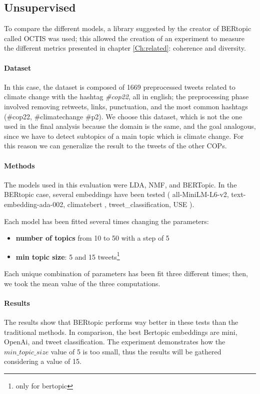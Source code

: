 \subsection{Unsupervised}
\label{sec:unsupervised}
To compare the different models, a library suggested by the creator of BERtopic called OCTIS \cite{DBLP:conf/clic-it/TerragniF21} \cite{terragni2020octis} was used; this allowed the creation of an experiment to measure the different metrics presented in chapter \ref{Ch:related}: coherence and diversity.




\paragraph{Dataset}
In this case, the dataset is composed of 1669 preprocessed tweets related to climate change with the hashtag \textit{\#cop22}, all in english; the preprocessing phase involved removing retweets, links, punctuation, and the most common hashtags (\#cop22, \#climatechange \#p2).  We choose this dataset, which is not the one used in the final analysis because the domain is the same, and the goal analogous, since we have to detect subtopics of a main topic which is climate change. For this reason we can generalize the result to the tweets of the other COPs.

\paragraph{Methods}

The models used in this evaluation were LDA, NMF, and BERTopic. In the BERtopic case, several embeddings have been tested (  all-MiniLM-L6-v2, text-embedding-ada-002, climatebert \cite{webersinke_climatebert_2022}, tweet\_classification, USE \cite{cer_use_2018}).

Each model has been fitted several times changing the parameters:
\begin{itemize}
    \item  \textbf{number of topics} from 10 to 50 with a step of 5 
    \item \textbf{min topic size}: 5 and 15  tweets\footnote{only for bertopic}
\end{itemize}


Each unique combination of parameters has been fit three different times; then, we took the mean value of the three computations.

\paragraph{Results}
The results show that BERtopic performs way better in these tests than the traditional methods. In comparison, the best Bertopic embeddings are mini, OpenAi, and tweet classification.
The experiment demonstrates how the $min\_topic\_size$ value of 5 is too small, thus the results will be gathered considering a value of 15.

